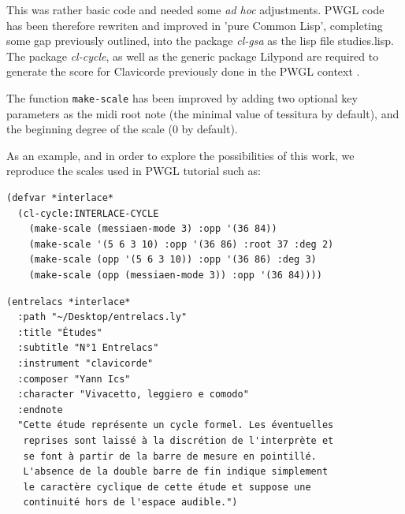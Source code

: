 


This was rather basic code and needed some \textit{ad hoc }adjustments. PWGL code has been therefore rewriten and improved in 'pure Common Lisp', completing some gap previously outlined, into the package \textit{cl-gsa} as the lisp file \textsf{studies.lisp}. The package \textit{cl-cycle}, as well as the generic package Lilypond are required to generate the score for Clavicorde previously done in the PWGL context .
%

\bigskip
The function \texttt{make-scale} has been improved by adding two optional key parameters as the midi root note (the minimal value of tessitura by default), and the beginning degree of the scale (0 by default).

\bigskip

As an example, and in order to explore the possibilities of this work, we reproduce the scales used in PWGL tutorial such as:


\begin{lstlisting}
(defvar *interlace*
  (cl-cycle:INTERLACE-CYCLE 
    (make-scale (messiaen-mode 3) :opp '(36 84))
    (make-scale '(5 6 3 10) :opp '(36 86) :root 37 :deg 2)
    (make-scale (opp '(5 6 3 10)) :opp '(36 86) :deg 3)
    (make-scale (opp (messiaen-mode 3)) :opp '(36 84))))
\end{lstlisting}
  
\begin{lstlisting}  
(entrelacs *interlace*
  :path "~/Desktop/entrelacs.ly"
  :title "Études"
  :subtitle "N°1 Entrelacs"
  :instrument "clavicorde"
  :composer "Yann Ics"
  :character "Vivacetto, leggiero e comodo"
  :endnote 
  "Cette étude représente un cycle formel. Les éventuelles 
   reprises sont laissé à la discrétion de l'interprète et 
   se font à partir de la barre de mesure en pointillé. 
   L'absence de la double barre de fin indique simplement
   le caractère cyclique de cette étude et suppose une 
   continuité hors de l'espace audible.")
\end{lstlisting}

